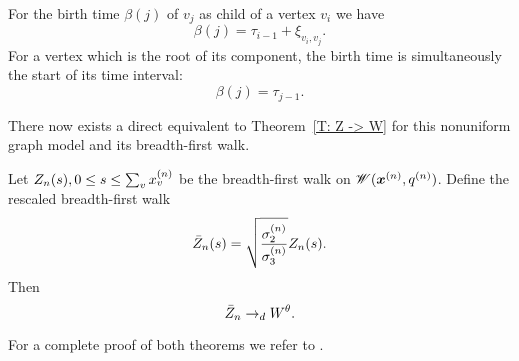 For the birth time $\beta(j)$ of $v_j$ as child of a vertex $v_i$ we have
\begin{equation}
	\beta(j) = \tau_{i-1} + \xi_{v_i, v_j}.
\end{equation}
For a vertex which is the root of its component, the birth time is simultaneously the start of its time interval:
\begin{equation}
	\beta(j) = \tau_{j-1}.
\end{equation}


There now exists a direct equivalent to Theorem~\ref{T: Z -> W} for this nonuniform graph model and its breadth-first walk.

\begin{theorem} \label{T: Z -> W nonu}
	Let $Z_n(s), 0 \leq s \leq \sum_{v} x^{(n)}_v$ be the breadth-first walk on $\mathscr{W}(\boldsymbol{x}^{(n)}, q^{(n)})$.
	Define the rescaled breadth-first walk
	\begin{equation}
		\bar{Z}_n(s) = \sqrt{\frac{\sigma^{(n)}_2}{\sigma^{(n)}_3}} Z_n(s).
	\end{equation}
	Then
	\begin{equation}
		\bar{Z}_n \rightarrow_d W^{\theta}.
	\end{equation}	
\end{theorem}

For a complete proof of both theorems we refer to \cite[p.828ff.]{Aldous.1997}.
